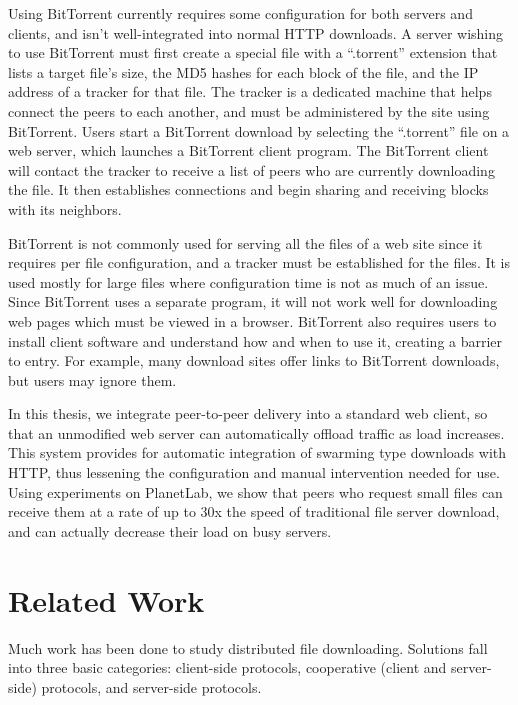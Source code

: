 Using BitTorrent currently requires some configuration for both servers and clients, and isn't well-integrated into normal HTTP downloads.  A server wishing to use BitTorrent 
must first create a special file with a ``.torrent'' extension that lists a target file's size, the MD5 hashes for each block of the file, and 
the IP address of a tracker for that file.  The tracker is a dedicated machine that helps connect the peers to each another, and must be administered
by the site using BitTorrent.  Users start a BitTorrent download by selecting the ``.torrent'' file on a web server, which launches a BitTorrent client program.
The BitTorrent client will contact the tracker to receive a list of peers who are currently downloading the file.  It then establishes connections and 
begin sharing and receiving blocks with its neighbors.


BitTorrent is not commonly used for serving all the files of a web site since it requires per file configuration, and a tracker must be established for the files.  It is used mostly for large files where
configuration time is not as much of an issue.  Since BitTorrent uses a separate program, it will not work well for downloading web pages which must be viewed in a browser.  
BitTorrent also requires users to install client software and understand how and when to use it, creating a barrier to entry.  For example, many download sites offer links to BitTorrent downloads,
but users may ignore them.

In this thesis, we integrate peer-to-peer delivery into a standard web client, so that an unmodified web server can automatically offload traffic as load increases. 
This system provides for automatic integration of swarming type downloads with HTTP, thus lessening the configuration and manual intervention needed for use.
Using experiments on PlanetLab, we show that peers who request small files can receive them at a rate of up to 30x the speed of traditional file server download, and
can actually decrease their load on busy servers.  

\section{Related Work}
Much work has been done to study distributed file downloading.  Solutions fall into three basic categories: client-side protocols, cooperative (client and server-side) protocols, 
and server-side protocols.

